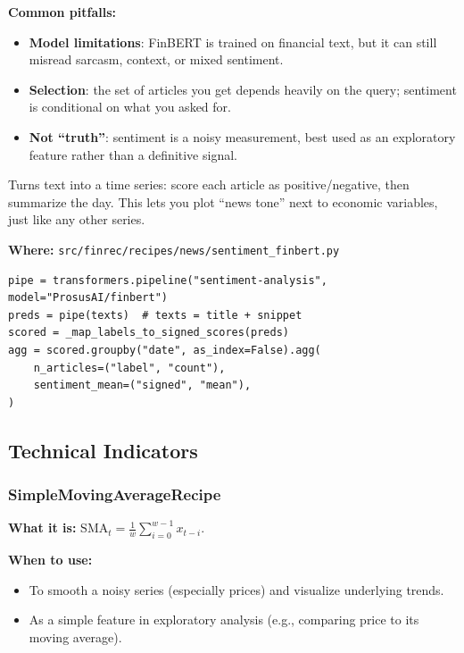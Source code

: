\documentclass[11pt,a4paper]{article}
\begin{document}
\textbf{Common pitfalls:}
\begin{itemize}[leftmargin=2em]
  \item \textbf{Model limitations}: FinBERT is trained on financial text, but it can still misread sarcasm, context, or mixed sentiment.
  \item \textbf{Selection}: the set of articles you get depends heavily on the query; sentiment is conditional on what you asked for.
  \item \textbf{Not ``truth''}: sentiment is a noisy measurement, best used as an exploratory feature rather than a definitive signal.
\end{itemize}

\begin{intuitionbox}
Turns text into a time series: score each article as positive/negative, then summarize the day. This lets you plot ``news tone'' next to economic variables, just like any other series.
\end{intuitionbox}

\textbf{Where:} \texttt{src/finrec/recipes/news/sentiment\_finbert.py}

\begin{lstlisting}
pipe = transformers.pipeline("sentiment-analysis", model="ProsusAI/finbert")
preds = pipe(texts)  # texts = title + snippet
scored = _map_labels_to_signed_scores(preds)
agg = scored.groupby("date", as_index=False).agg(
    n_articles=("label", "count"),
    sentiment_mean=("signed", "mean"),
)
\end{lstlisting}

\subsection{Technical Indicators}

\subsubsection{SimpleMovingAverageRecipe}\label{sec:sma}

\textbf{What it is:} $\text{SMA}_t = \frac{1}{w}\sum_{i=0}^{w-1} x_{t-i}$.

\textbf{When to use:}
\begin{itemize}[leftmargin=2em]
  \item To smooth a noisy series (especially prices) and visualize underlying trends.
  \item As a simple feature in exploratory analysis (e.g., comparing price to its moving average).
\end{itemize}
\end{document}
